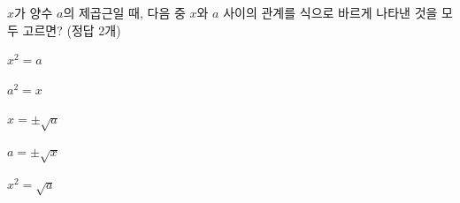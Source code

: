$x$가 양수 $a$의 제곱근일 때, 다음 중 $x$와 $a$ 사이의 관계를 식으로 바르게 나타낸 것을 모두 고르면? (정답 2개)
\begin{choices32}{\rule[-3ex]{0pt}{8ex}$x^2=a$}{\rule[-3ex]{0pt}{8ex}$a^2=x$}{\rule[-3ex]{0pt}{8ex}$x=\pm\sqrt{a}$}{\rule[-3ex]{0pt}{8ex}$a=\pm\sqrt{x}$}{\rule[-3ex]{0pt}{8ex}$x^2=\sqrt{a}$}\end{choices32}
